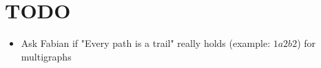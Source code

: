 \section{TODO}\par
\begin{itemize}
  \item Ask Fabian if "Every path is a trail" really holds (example: $1a2b2$) for multigraphs 
\end{itemize}
